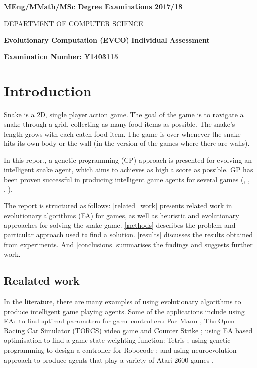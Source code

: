 \documentclass[12pt,a4paper]{article}
\begin{document}
	
	\begin{titlepage}
		\begin{center}
		\textbf{MEng/MMath/MSc Degree Examinations 2017/18}
		
		\textsc{DEPARTMENT OF COMPUTER SCIENCE}
		
		\vspace{3cm}
		
		\Large
		\textbf{Evolutionary Computation (EVCO)
		Individual Assessment}
	
		\vspace{1.5cm}
		
		\large
		\textbf{Examination Number: Y1403115}
		\end{center}
	\end{titlepage}
	
	
	\section{Introduction}
	Snake is a 2D, single player action game. The goal of the game is to navigate a snake through a grid, collecting as many food items as possible. The snake's length grows with each eaten food item. The game is over whenever the snake hits its own body or the wall (in the version of the games where there are walls). 
	
	In this report, a genetic programming (GP) approach is presented for evolving an intelligent snake agent, which aims to achieves as high a score as possible. GP has been proven successful in producing intelligent game agents for several games (\cite{ehlis_application_2000}, \cite{cole_using_2004}, \cite{shichel_gp-robocode:_2005}, \cite{koza_genetic_1992}).
	
	The report is structured as follows: \autoref{related_work} presents related work in evolutionary algorithms (EA) for games, as well as heuristic and evolutionary approaches for solving the snake game. \autoref{methods} describes the problem and particular approach used to find a solution. \autoref{results} discusses the results obtained from experiments. And \autoref{conclusions} summarises the findings and suggests further work.
	
	\subsection{Realated work} \label{related_work}
	In the literature, there are many examples of using evolutionary algorithms to produce intelligent game playing agents. Some of the applications include using EAs to find optimal parameters for game controllers: Pac-Mann \cite{gallagher_learning_2003}, The Open Racing Car Simulator (TORCS) video game \cite{munoz_multi-objective_2010} and Counter Strike \cite{cole_using_2004}; using EA based optimisation to find a game state weighting function: Tetris \cite{bohm_evolutionary_2018}; using genetic programming to design a controller for Robocode \cite{shichel_gp-robocode:_2005}; and using neuroevolution approach to produce agents that play a variety of Atari 2600 games  \cite{hausknecht_neuroevolution_2014}.
	
\end{document}
